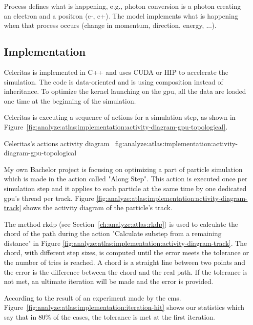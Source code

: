 Process defines what is happening, e.g., photon conversion is a photon creating
an electron and a positron (e-, e+).
The model implements what is happening when that process occurs (change in
momentum, direction, energy, ...).


\subsection{Implementation}
\label{ch:analyze:atlas:implementation}

Celeritas is implemented in C++ and uses CUDA or HIP to accelerate the
simulation.
The code is data-oriented and is using composition instead of inheritance.
To optimize the kernel launching on the \acrshort{gpu}, all the data are loaded
one time at the beginning of the simulation.

Celeritas is executing a sequence of actions for a simulation step, as shown in
Figure~\ref{fig:analyze:atlas:implementation:activity-diagram-gpu-topological}.

{Celeritas's actions activity diagram~\cite{chep2023-presentation-johnson}}
{fig:analyze:atlas:implementation:activity-diagram-gpu-topological}

My own Bachelor project is focusing on optimizing a part of particle simulation
which is made in the action called "Along Step".
This action is executed once per simulation step and it applies to each particle
at the same time by one dedicated \acrshort{gpu}'s thread per track.
Figure \ref{fig:analyze:atlas:implementation:activity-diagram-track} shows
the activity diagram of the particle's track.

The method \acrshort{rkdp} (see Section~\ref{ch:analyze:atlas:rkdp}) is used to calculate the
chord of the path during the action "Calculate substep from a remaining distance"
in Figure \ref{fig:analyze:atlas:implementation:activity-diagram-track}.
The chord, with different step sizes, is computed until the error meets the
tolerance or the number of tries is reached.
A chord is a straight line between two points and the error is the difference
between the chord and the real path.
If the tolerance is not met, an ultimate iteration will be made and the error
is provided.

According to the result of an experiment made by the \acrfull{cms}.
Figure~\ref{fig:analyze:atlas:implementation:iteration-hit} shows our statistics
which say that in 80\% of the cases, the tolerance is met at the first
iteration.

